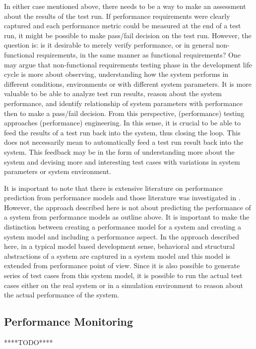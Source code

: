 In either case mentioned above, there needs to be a way to make an assessment about the results of the test run. If performance requirements were clearly captured and each performance metric could be measured at the end of a test run, it might be possible to make pass/fail decision on the test run. However, the question is: is it desirable to merely verify performance, or in general non-functional requirements, in the same manner as functional requirements? One may argue that non-functional requirements testing phase in the development life cycle is more about observing, understanding how the system performs in different conditions, environments or with different system parameters. It is more valuable to be able to analyze test run results, reason about the system performance, and identify relationship of system parameters with performance then to make a pass/fail decision. From this perspective, (performance) testing approaches (performance) engineering. In this sense, it is crucial to be able to feed the results of a test run back into the system, thus closing the loop. This does not necessarily mean to automatically feed a test run result back into the system. This feedback may be in the form of understanding more about the system and devising more and interesting test cases with variations in system parameters or system environment. 

It is important to note that there is extensive literature on performance prediction from performance models and those literature was investigated in \cite{areapaper}. However, the approach described here is not about predicting the performance of a system from performance models as outline above. It is important to make the distinction between creating a performance model for a system and creating a system model and including a  performance aspect. In the approach described here, in a typical model based development sense, behavioral and structural abstractions of a system are captured in a system model and this model is extended from performance point of view. Since it is also possible to generate series of test cases from this system model, it is possible to run the actual test cases either on the real system or in a simulation environment to reason about the actual performance of the system.

\subsection{Performance Monitoring}
****TODO****

